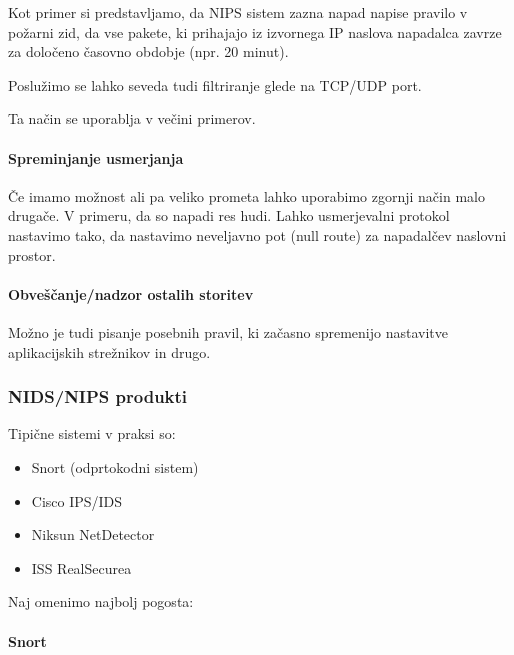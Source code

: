 \documentclass[12pt]{article}
\begin{document}
Kot primer si predstavljamo, da NIPS sistem zazna napad napise pravilo v požarni zid, da vse pakete, ki prihajajo iz izvornega IP naslova napadalca zavrze za določeno časovno obdobje (npr. 20 minut).

Poslužimo se lahko seveda tudi filtriranje glede na TCP/UDP port.

Ta način se uporablja v večini primerov.


\paragraph{Spreminjanje usmerjanja} %

Če imamo možnost ali pa veliko prometa lahko uporabimo zgornji način malo drugače.
V primeru, da so napadi res hudi. Lahko usmerjevalni protokol nastavimo tako, da nastavimo neveljavno pot (null route) za napadalčev naslovni prostor.


\paragraph{Obveščanje/nadzor ostalih storitev} %

Možno je tudi pisanje posebnih pravil, ki začasno spremenijo nastavitve aplikacijskih strežnikov in drugo.



\subsubsection{NIDS/NIPS produkti} %

Tipične sistemi v praksi so:
\begin{itemize}
    \item Snort (odprtokodni sistem)
    \item Cisco IPS/IDS
    \item Niksun NetDetector
    \item ISS RealSecurea
\end{itemize}

Naj omenimo najbolj pogosta:


\paragraph{Snort} %
\label{par:Snort}
\end{document}
